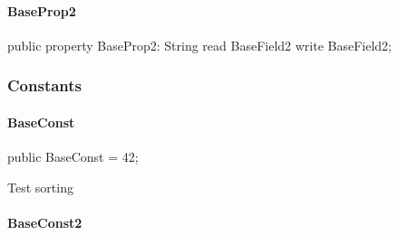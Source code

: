 \documentclass{report}
\begin{document}
\paragraph*{BaseProp2}\hspace*{\fill}

\begin{list}{}{
\setlength{\itemindent}{0cm}
\setlength{\listparindent}{0cm}
\setlength{\leftmargin}{\evensidemargin}
\addtolength{\leftmargin}{\tmplength}
\settowidth{\labelsep}{X}
\addtolength{\leftmargin}{\labelsep}
\setlength{\labelwidth}{\tmplength}
}
\begin{flushleft}
\item[\textbf{Declaration}\hfill]
\begin{ttfamily}
public property BaseProp2: String read BaseField2 write BaseField2;\end{ttfamily}


\end{flushleft}
\end{list}
\subsubsection*{\large{\textbf{Constants}}\normalsize\hspace{1ex}\hfill}
\paragraph*{BaseConst}\hspace*{\fill}

\begin{list}{}{
\setlength{\itemindent}{0cm}
\setlength{\listparindent}{0cm}
\setlength{\leftmargin}{\evensidemargin}
\addtolength{\leftmargin}{\tmplength}
\settowidth{\labelsep}{X}
\addtolength{\leftmargin}{\labelsep}
\setlength{\labelwidth}{\tmplength}
}
\begin{flushleft}
\item[\textbf{Declaration}\hfill]
\begin{ttfamily}
public BaseConst = 42;\end{ttfamily}


\end{flushleft}
\par
\item[\textbf{Description}]
Test sorting

\end{list}
\paragraph*{BaseConst2}\hspace*{\fill}
\end{document}
